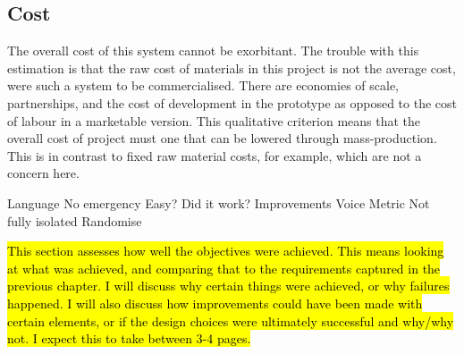 \documentclass[main.tex]{subfiles}
\begin{document}
\subsection{Cost}
The overall cost of this system cannot be exorbitant. The trouble with this estimation is that the raw cost of materials in this project is not the average cost, were such a system to be commercialised. There are economies of scale, partnerships, and the cost of development in the prototype as opposed to the cost of labour in a marketable version. This qualitative criterion means that the overall cost of project must one that can be lowered through mass-production. This is in contrast to fixed raw material costs, for example, which are not a concern here.

Language
No emergency
Easy?
Did it work?
Improvements
Voice Metric
Not fully isolated
Randomise


\hl{This section assesses how well the objectives were achieved. This means looking at what was achieved, and comparing that to the requirements captured in the previous chapter. I will discuss why certain things were achieved, or why failures happened. I will also discuss how improvements could have been made with certain elements, or if the design choices were ultimately successful and why/why not. I expect this to take between 3-4 pages.}
\end{document}
